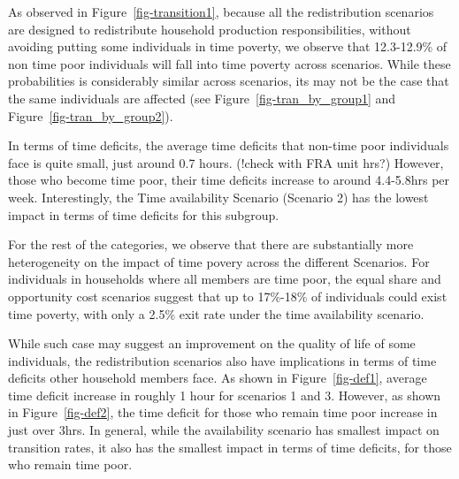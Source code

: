\documentclass[
  11pt,
]{article}
\begin{document}
As observed in Figure~\ref{fig-transition1}, because all the
redistribution scenarios are designed to redistribute household
production responsibilities, without avoiding putting some individuals
in time poverty, we observe that 12.3-12.9\% of non time poor
individuals will fall into time poverty across scenarios. While these
probabilities is considerably similar across scenarios, its may not be
the case that the same individuals are affected (see
Figure~\ref{fig-tran_by_group1} and Figure~\ref{fig-tran_by_group2}).

In terms of time deficits, the average time deficits that non-time poor
individuals face is quite small, just around 0.7 hours. (!check with FRA
unit hrs?) However, those who become time poor, their time deficits
increase to around 4.4-5.8hrs per week. Interestingly, the Time
availability Scenario (Scenario 2) has the lowest impact in terms of
time deficits for this subgroup.

For the rest of the categories, we observe that there are substantially
more heterogeneity on the impact of time povery across the different
Scenarios. For individuals in households where all members are time
poor, the equal share and opportunity cost scenarios suggest that up to
17\%-18\% of individuals could exist time poverty, with only a 2.5\%
exit rate under the time availability scenario.

While such case may suggest an improvement on the quality of life of
some individuals, the redistribution scenarios also have implications in
terms of time deficits other household members face. As shown in
Figure~\ref{fig-def1}, average time deficit increase in roughly 1 hour
for scenarios 1 and 3. However, as shown in Figure~\ref{fig-def2}, the
time deficit for those who remain time poor increase in just over 3hrs.
In general, while the availability scenario has smallest impact on
transition rates, it also has the smallest impact in terms of time
deficits, for those who remain time poor.
\end{document}
